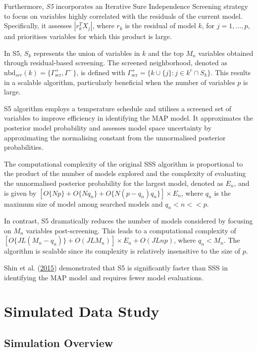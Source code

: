 \documentclass[
  11pt,
]{article}
\begin{document}
Furthermore, \emph{S5} incorporates an Iterative Sure Independence
Screening strategy to focus on variables highly correlated with the
residuals of the current model. Specifically, it assesses
\(|r_k^T X_j|\), where \(r_k\) is the residual of model \(k\), for
\(j = 1, \ldots, p\), and prioritises variables for which this product
is large.

In S5, \(S_k\) represents the union of variables in \(k\) and the top
\(M_n\) variables obtained through residual-based screening. The
screened neighborhood, denoted as
\(\text{nbd}_{scr}(k) = \{\Gamma^{+}_{\text{scr}}, \Gamma^{-}\}\), is
defined with
\(\Gamma^{+}_{\text{scr}} = \{k \cup \{j\} : j \in k^c \cap S_k\}\).
This results in a scalable algorithm, particularly beneficial when the
number of variables \(p\) is large.

S5 algorithm employs a temperature schedule and utilises a screened set
of variables to improve efficiency in identifying the MAP model. It
approximates the posterior model probability and assesses model space
uncertainty by approximating the normalising constant from the
unnormalised posterior probabilities.

The computational complexity of the original SSS algorithm is
proportional to the product of the number of models explored and the
complexity of evaluating the unnormalised posterior probability for the
largest model, denoted as \(E_n\), and is given by
\([ O\{Np\} + O\{Nq_n\} + O\{N(p-q_n)q_n\} ] \times E_n\), where \(q_n\)
is the maximum size of model among searched models and \(q_n < n <<p\).

In contrast, S5 dramatically reduces the number of models considered by
focusing on \(M_n\) variables post-screening. This leads to a
computational complexity of
\([O\{JL(M_n - q_n)\} + O(JLM_n)] \times E_n + O(JLnp)\), where
\(q_n < M_n\). The algorithm is scalable since its complexity is
relatively insensitive to the size of \(p\).

Shin et al. (\protect\hyperlink{ref-Shin2015}{2015}) demonstrated that
S5 is significantly faster than SSS in identifying the MAP model and
requires fewer model evaluations.

\newpage

\section{Simulated Data Study}

\subsection{Simulation Overview}
\end{document}
